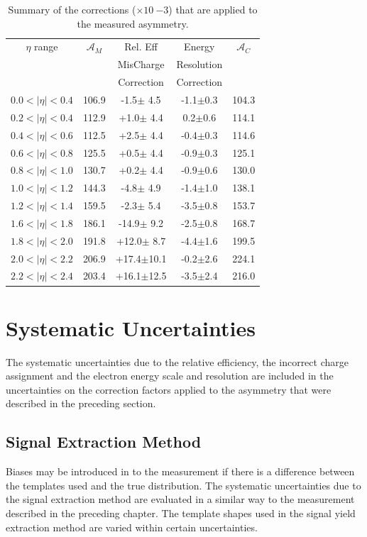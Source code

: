 \begin{table}[htbp]
  \begin{center}
    \begin{tabular}{ccccc}
\toprule
$\eta$ range & $\mathcal{A}_M$ & Rel. Eff & Energy & $\mathcal{A}_C$ \\
& & MisCharge & Resolution &  \\
& & Correction  & Correction & \\
\midrule
 $0.0<|\eta|<0.4$ & 106.9 &-1.5$\pm$ 4.5 & -1.1$\pm$0.3 & 104.3\\ 
 $0.2<|\eta|<0.4$ & 112.9 &+1.0$\pm$ 4.4 &  0.2$\pm$0.6 & 114.1\\ 
 $0.4<|\eta|<0.6$ & 112.5 &+2.5$\pm$ 4.4 & -0.4$\pm$0.3 & 114.6\\
 $0.6<|\eta|<0.8$ & 125.5 &+0.5$\pm$ 4.4 & -0.9$\pm$0.3 & 125.1\\ 
 $0.8<|\eta|<1.0$ & 130.7 &+0.2$\pm$ 4.4 & -0.9$\pm$0.6 & 130.0\\ 
 $1.0<|\eta|<1.2$ & 144.3 &-4.8$\pm$ 4.9 & -1.4$\pm$1.0 & 138.1\\ 
 $1.2<|\eta|<1.4$ & 159.5 &-2.3$\pm$ 5.4 & -3.5$\pm$0.8 & 153.7\\ 
 $1.6<|\eta|<1.8$ & 186.1 &-14.9$\pm$ 9.2 & -2.5$\pm$0.8 & 168.7\\
 $1.8<|\eta|<2.0$ & 191.8 &+12.0$\pm$ 8.7 & -4.4$\pm$1.6 & 199.5\\
 $2.0<|\eta|<2.2$ & 206.9 &+17.4$\pm$10.1&  -0.2$\pm$2.6 & 224.1\\
 $2.2<|\eta|<2.4$ & 203.4 &+16.1$\pm$12.5 & -3.5$\pm$2.4 & 216.0\\
\bottomrule
    \end{tabular}
    \caption{\label{tab:correctionfactors}Summary of the corrections ($\times
10~{-3}$) that are applied to the measured asymmetry.}
  \end{center}
\end{table}


\section{Systematic Uncertainties}
The systematic uncertainties due to the relative efficiency, the incorrect
charge assignment and the electron energy scale and resolution are included in
the uncertainties on the correction factors applied to the asymmetry that were
described in the preceding section.

\subsection{Signal Extraction Method}
Biases may be introduced in to the measurement if there is a
difference between the \ETm templates used and the true \ETm distribution. 
The systematic uncertainties due to the signal extraction method are evaluated
in a similar way to the measurement described in the preceding chapter.  The
template shapes used in the signal yield extraction method are varied within
certain uncertainties. 

